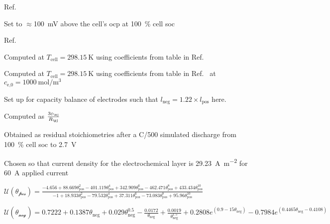 \begin{table}[!htbp]
\begin{threeparttable}
        \begin{tablenotes}
        \item[a] Ref.~\cite{Northrop2011}
        \item[b] Set to $\approx $\SI{100}{\milli\volt} above the cell's \gls{ocp} at \SI{100}{\percent} cell \gls{soc}
        \item[c] Ref.~\cite{Subramanian2009}
        \item[d] Computed at $T_\text{cell} = \SI{298.15}{\kelvin}$ using coefficients from table  in Ref.~\cite{Valoen2005} \\
        \item[e] Computed at $T_\text{cell} = \SI{298.15}{\kelvin}$ using coefficients from table  in Ref.~\cite{Valoen2005} at $c_\text{e,0}= \SI{1000}{\mole\per\meter\cubed}$\\
        \item[f] Set up for capacity balance of electrodes such that $l_\text{neg} = 1.22 \times l_\text{pos}$ here.
        \item[g] Computed as $\frac{3 \varepsilon_\sj}{R_\pj}$\\
        \item[h] Obtained as residual stoichiometries after a C/\num{500} simulated discharge from \SI{100}{\percent} cell \gls{soc} to \SI{2.7}{V}
        \item[i] Chosen so that current density for the electrochemical layer is \SI{29.23}{\ampere\per\meter\squared} for \SI{60}{\ampere} applied current
        \item[k] $ \mathcal{U(\theta_\text{pos})} = \displaystyle \frac{-4.656 + 88.669\theta_\text{pos}^2 - 401.119\theta_\text{pos}^4 + 342.909\theta_\text{pos}^6 - 462.471\theta_\text{pos}^8 + 433.434\theta_\text{pos}^{10}}{-1 + 18.933\theta_\text{pos}^2 - 79.532\theta_\text{pos}^4 + 37.311\theta_\text{pos}^6 - 73.083\theta_\text{pos}^8 + 95.96\theta_\text{pos}^{10}}$ \\[0.25em]
        \item[m] $\mathcal{U(\theta_\text{neg})} = 0.7222 + 0.1387\theta_\text{neg} + 0.029\theta_\text{neg}^{0.5} - \frac{0.0172}{\theta_\text{neg}} + \frac{0.0019}{\theta_\text{neg}^{1.5}} + 0.2808 e^{(0.9 - 15\theta_\text{neg})} - 0.7984 e^{(0.4465\theta_\text{neg} - 0.4108)}$\vfill
        \end{tablenotes}

    \end{threeparttable}
\end{table}


